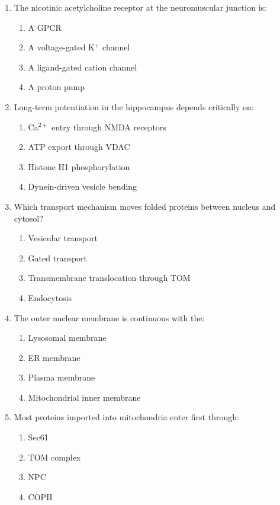 \documentclass[12pt,fontset=none]{ctexart}
\begin{document}
\begin{enumerate}
\item The nicotinic acetylcholine receptor at the neuromuscular junction is:
\begin{enumerate}[label=\alph*.]
\item A GPCR
\item A voltage-gated K$^+$ channel
\item A ligand-gated cation channel
\item A proton pump
\end{enumerate}

\item Long-term potentiation in the hippocampus depends critically on:
\begin{enumerate}[label=\alph*.]
\item Ca$^{2+}$ entry through NMDA receptors
\item ATP export through VDAC
\item Histone H1 phosphorylation
\item Dynein-driven vesicle bending
\end{enumerate}

\item Which transport mechanism moves folded proteins between nucleus and cytosol?
\begin{enumerate}[label=\alph*.]
\item Vesicular transport
\item Gated transport
\item Transmembrane translocation through TOM
\item Endocytosis
\end{enumerate}

\item The outer nuclear membrane is continuous with the:
\begin{enumerate}[label=\alph*.]
\item Lysosomal membrane
\item ER membrane
\item Plasma membrane
\item Mitochondrial inner membrane
\end{enumerate}

\item Most proteins imported into mitochondria enter first through:
\begin{enumerate}[label=\alph*.]
\item Sec61
\item TOM complex
\item NPC
\item COPII
\end{enumerate}


\end{enumerate}
\end{document}
